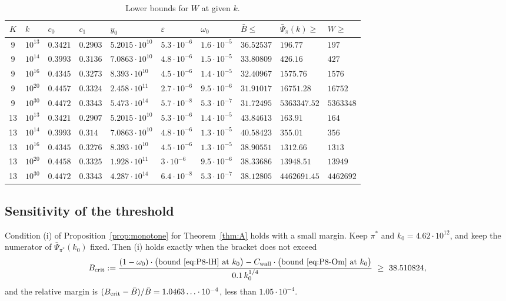 \documentclass[11pt]{amsart}
\newcommand{\eps}{\varepsilon}
\theoremstyle{definition}
\theoremstyle{remark}
\numberwithin{equation}{section}
\begin{document}
\begin{table}[ht]
\centering
\caption{Lower bounds for $W$ at given $k$.}\label{tab:const-k}
\small
\begin{tabular}{|c|l|l|l|l|l|l|l|l|l|}
\hline
$K$ & $k$ & $c_0$ & $c_1$ & $y_0$ & $\eps$ & $\omega_0$ & $\bar B\le$ & $\bar\Psi_\pi(k)\ge$ & $W\ge$\\
\hline
9 & $10^{13}$ & $0.3421$ & $0.2903$ & $5.2015\cdot10^{10}$ & $5.3\cdot10^{-6}$ & $1.6\cdot10^{-5}$ & $36.52537$ & $196.77$ & $197$\\
9 & $10^{14}$ & $0.3993$ & $0.3136$ & $7.0863\cdot10^{10}$ & $4.8\cdot10^{-6}$ & $1.5\cdot10^{-5}$ & $33.80809$ & $426.16$ & $427$\\
9 & $10^{16}$ & $0.4345$ & $0.3273$ & $8.393\cdot10^{10}$ & $4.5\cdot10^{-6}$ & $1.4\cdot10^{-5}$ & $32.40967$ & $1575.76$ & $1576$\\
9 & $10^{20}$ & $0.4457$ & $0.3324$ & $2.458\cdot10^{11}$ & $2.7\cdot10^{-6}$ & $9.5\cdot10^{-6}$ & $31.91017$ & $16751.28$ & $16752$\\
9 & $10^{30}$ & $0.4472$ & $0.3343$ & $5.473\cdot10^{14}$ & $5.7\cdot10^{-8}$ & $5.3\cdot10^{-7}$ & $31.72495$ & $5363347.52$ & $5363348$\\
\hline
13 & $10^{13}$ & $0.3421$ & $0.2907$ & $5.2015\cdot10^{10}$ & $5.3\cdot10^{-6}$ & $1.4\cdot10^{-5}$ & $43.84613$ & $163.91$ & $164$\\
13 & $10^{14}$ & $0.3993$ & $0.314$ & $7.0863\cdot10^{10}$ & $4.8\cdot10^{-6}$ & $1.3\cdot10^{-5}$ & $40.58423$ & $355.01$ & $356$\\
13 & $10^{16}$ & $0.4345$ & $0.3276$ & $8.393\cdot10^{10}$ & $4.5\cdot10^{-6}$ & $1.3\cdot10^{-5}$ & $38.90551$ & $1312.66$ & $1313$\\
13 & $10^{20}$ & $0.4458$ & $0.3325$ & $1.928\cdot10^{11}$ & $3\cdot10^{-6}$ & $9.5\cdot10^{-6}$ & $38.33686$ & $13948.51$ & $13949$\\
13 & $10^{30}$ & $0.4472$ & $0.3343$ & $4.287\cdot10^{14}$ & $6.4\cdot10^{-8}$ & $5.3\cdot10^{-7}$ & $38.12805$ & $4462691.45$ & $4462692$\\
\hline
\end{tabular}
\end{table}

\subsection{Sensitivity of the threshold}\label{subsec:const-sens}

Condition (i) of Proposition~\ref{prop:monotone} for Theorem~\ref{thm:A} holds with a small margin. Keep $\pi^*$ and
$k_0=4.62\cdot10^{12}$, and keep the numerator of $\bar\Psi_{\pi^*}(k_0)$ fixed. Then (i) holds exactly when the
bracket does not exceed
\[
B_{\rm crit}:=\frac{(1-\omega_0)\cdot\big(\text{bound \eqref{eq:P8-lH} at }k_0\big)-C_{\rm wall}\cdot\big(\text{bound
\eqref{eq:P8-Om} at }k_0\big)}{0.1\,k_0^{1/4}}\ \ge\ 38.510824,
\]
and the relative margin is $(B_{\rm crit}-\bar B)/\bar B=1.0463\ldots\cdot10^{-4}$, less than $1.05\cdot10^{-4}$.
\end{document}

